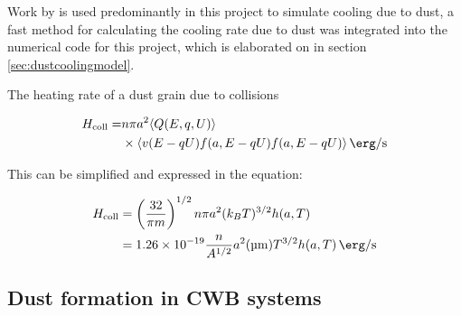 Work by \cite{dwek_infrared_1981} is used predominantly in this project to simulate cooling due to dust, a fast method for calculating the cooling rate due to dust was integrated into the numerical code for this project, which is elaborated on in section \ref{sec:dustcoolingmodel}.


The heating rate of a dust grain due to collisions 

\begin{equation}
  \begin{split} 
      H_\text{coll} = & n \pi a^2 \langle Q(E,q,U) \rangle \\
      & \times \langle v (E-qU) f(a,E-qU) f(a,E-qU) \rangle \, \si{\erg\per\second}
  \end{split}
\end{equation}

This can be simplified and expressed in the equation:

\begin{equation}
  \begin{split}
    H_\text{coll} & = \left(\frac{32}{\pi m}\right)^{1/2} n\pi a^2 (k_B T)^{3/2} h(a,T) \\
    & = \num{1.26e-19} \frac{n}{A^{1/2}} a^2 (\si{\micro\metre}) T^{3/2} h(a,T) \, \si{\erg\per\second}
  \end{split}
\end{equation}







\subsection{Dust formation in CWB systems}
\label{sec:cwbdust}

